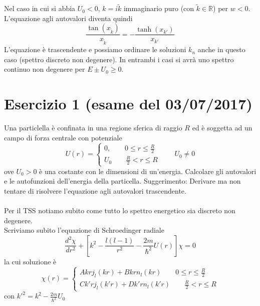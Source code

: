 \documentclass[a4paper]{article}
\begin{document}
        Nel caso in cui si abbia $U_0<0$, $k=i\tilde{k}$ immaginario puro (con $\tilde{k}\in\mathbb{R}$) per $w<0$.
        L'equazione agli autovalori diventa quindi
        \begin{equation*}
            \frac{\tan(x_{\tilde{k}})}{x_{\tilde{k}}}=-\frac{\tanh(x_{k'})}{x_{k'}}
        \end{equation*}
        L'equazione è trascendente e possiamo ordinare le soluzioni $k_n$ anche in questo caso (spettro discreto non degenere).
        In entrambi i casi si avrà uno spettro continuo non degenere per $E\pm U_0\geq 0$.

    \section*{Esercizio 1 (esame del 03/07/2017)}
    Una particlella è confinata in una regione sferica di raggio $R$ ed è soggetta ad un campo di forza centrale con potenziale
    \begin{equation*}
        U(r)=
        \begin{cases}
            0,\quad\quad 0\leq r\leq\frac{R}{2}\\
            U_0\quad\quad \frac{R}{2}<r\leq R
        \end{cases}
        \quad\quad U_0\neq 0
    \end{equation*}
    ove $U_0 > 0$ è una costante con le dimensioni di un'energia. Calcolare gli autovalori e le autofunzioni dell'energia della particella.
    Suggerimento: Derivare ma non tentare di risolvere l'equazione agli autovalori trascendente.
    \\
    \\
    Per il TSS notiamo subito come tutto lo spettro energetico sia discreto non degenere.\\
    Scriviamo subito l'equazione di Schroedinger radiale
    \begin{equation*}
        \frac{d^2\chi}{dr^2}+\left[k^2-\frac{l(l-1)}{r^2}-\frac{2m}{\hbar^2}U(r)\right]\chi=0
    \end{equation*}
    la cui soluzione è
    \begin{equation*}
        \chi(r)=
        \begin{cases}
            Akrj_l(kr)+Bkrn_l(kr)\quad\quad 0\leq r\leq\frac{R}{2}\\
            Ck'rj_l(k'r)+Dk'rn_l(k'r)\quad\quad \frac{R}{2}<r\leq R
        \end{cases}
    \end{equation*}
    con $k'^2=k^2-\frac{2m}{\hbar^2}U_0$
\end{document}
